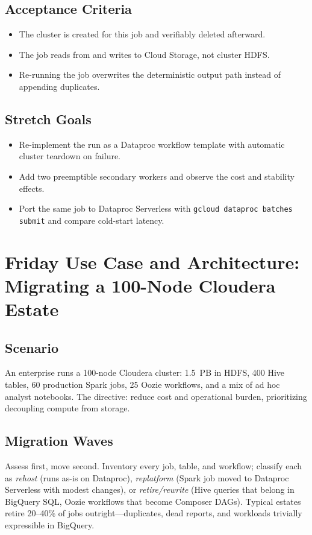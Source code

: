 \subsection*{Acceptance Criteria}
\begin{itemize}
    \item The cluster is created for this job and verifiably deleted afterward.
    \item The job reads from and writes to Cloud Storage, not cluster HDFS.
    \item Re-running the job overwrites the deterministic output path instead of appending duplicates.
\end{itemize}

\subsection*{Stretch Goals}
\begin{itemize}
    \item Re-implement the run as a Dataproc workflow template with automatic cluster teardown on failure.
    \item Add two preemptible secondary workers and observe the cost and stability effects.
    \item Port the same job to Dataproc Serverless with \texttt{gcloud dataproc batches submit} and compare cold-start latency.
\end{itemize}

\section{Friday Use Case and Architecture: Migrating a 100-Node Cloudera Estate}

\subsection{Scenario}
An enterprise runs a 100-node Cloudera cluster: 1.5~PB in HDFS, 400 Hive tables, 60 production Spark jobs, 25 Oozie workflows, and a mix of ad hoc analyst notebooks. The directive: reduce cost and operational burden, prioritizing decoupling compute from storage.

\subsection{Migration Waves}
Assess first, move second. Inventory every job, table, and workflow; classify each as \emph{rehost} (runs as-is on Dataproc), \emph{replatform} (Spark job moved to Dataproc Serverless with modest changes), or \emph{retire/rewrite} (Hive queries that belong in BigQuery SQL, Oozie workflows that become Composer DAGs). Typical estates retire 20--40\% of jobs outright---duplicates, dead reports, and workloads trivially expressible in BigQuery.

